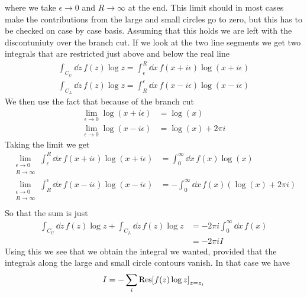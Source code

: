 \documentclass[a4paper,12pt]{article}
\begin{document}
where we take $\epsilon\to 0$ and $R\to \infty$ at the end. This limit should in most cases make the contributions from the large and small circles go to zero, but this has to be checked on case by case basis. Assuming that this holds we are left with the discontuniuty over the branch cut. If we look at the two line segments we get two integrals that are restricted just above and below the real line 
\begin{equation}
\begin{aligned}
\int_{C_U}\dd z\, f(z)\log z=\int_{\epsilon}^{R} \dd x\, f(x+i \epsilon)\log (x+i\epsilon)\\
\int_{C_L}\dd z\, f(z)\log z=\int_{R}^{\epsilon} \dd x\, f(x-i \epsilon)\log (x-i\epsilon)
\end{aligned}
\end{equation} 
We then use the fact that because of the branch cut
\begin{equation}
\begin{aligned}
\lim_{\epsilon\to 0}\log(x+i\epsilon)&=\log(x)\\
\lim_{\epsilon\to 0}\log(x-i\epsilon)&=\log(x)+2\pi i
\end{aligned}
\end{equation}
Taking the limit we get
\begin{equation}
	\begin{aligned}
		\lim_{\substack{\epsilon\to0\\R\to\infty}}\int_{\epsilon}^{R} \dd x\, f(x+i \epsilon)\log (x+i\epsilon)&=\int^{\infty}_{0} \dd x\, f(x)\log (x)\\
		\lim_{\substack{\epsilon\to0\\R\to\infty}}\int_{R}^{\epsilon} \dd x\, f(x-i \epsilon)\log (x-i\epsilon)&=-\int^{\infty}_{0} \dd x\, f(x)\left(\log (x)+2\pi i\right)\\
	\end{aligned}
\end{equation} 
So that the sum is just
\begin{equation}
\begin{aligned}
\int_{C_U}\dd z\, f(z)\log z+
\int_{C_L}\dd z\, f(z)\log z
&=-2\pi i\int^{\infty}_{0} \dd x\, f(x)\\
&=-2\pi i I
\end{aligned}
\end{equation}
Using this we see that we obtain the integral we wanted, provided that the integrals along the large and small circle contours vanish.
In that case we have
\begin{equation}
I=-\sum_{i}\Res[f(z)\log z]_{z=z_i}
\end{equation}
\end{document}
